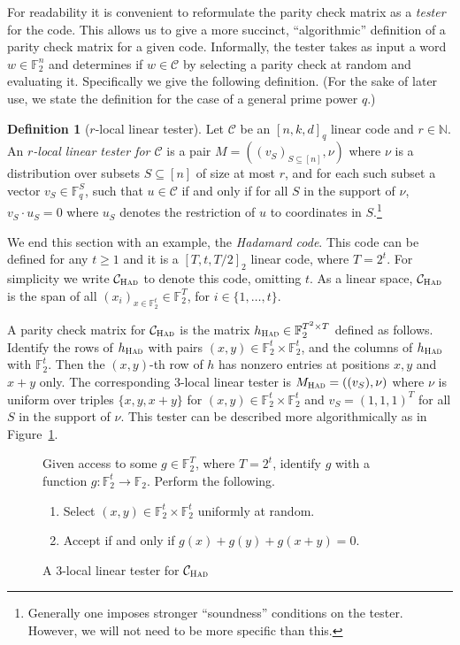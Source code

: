 \documentclass[11pt]{article}
\theoremstyle{definition}
\newtheorem{definition}[theorem]{Definition}
\newcommand{\code}{\mathcal{C}}
\newcommand{\field}{\mathbb{F}_2}
\newcommand{\N}{\ensuremath{\mathbb{N}}}
\newcommand{\F}{\ensuremath{\mathbb{F}}}
\newcommand{\mC}{\ensuremath{\mathcal{C}}}
\newcommand{\had}{\textsc{Had}}
\newenvironment{gamespec}{
  \begin{mdframed}[style=figstyle]}{
  \end{mdframed}}
\begin{document}
For readability it is convenient to reformulate the parity check matrix as a \emph{tester} for the code. This allows us to give a more succinct, ``algorithmic'' definition of a parity check matrix for a given code. Informally, the tester takes as input a word $w\in \F_2^n$ and determines if $w\in \mC$ by selecting a parity check at random and evaluating it. 
 Specifically we give the following definition. (For the sake of later use, we state the definition for the case of a general prime power $q$.)

\begin{definition}[$r$-local linear tester]\label{def:code-test}
Let $\code$ be an $[n,k,d]_q$ linear code and $r\in \N$.
An \emph{$r$-local linear tester for $\code$} is a pair $M = ((v_S)_{S \subseteq [n]},\nu)$ where $\nu$ is a distribution over subsets $S\subseteq [n]$ of size at most $r$, and for each such subset a vector $v_S\in\F_q^S$, such that $u\in \code$ if and only if for all $S$ in the support of $\nu$, $v_S\cdot u_S=0$ where $u_S$ denotes the restriction of $u$ to coordinates in $S$.\footnote{Generally one imposes stronger ``soundness'' conditions on the tester. However, we will not need to be more specific than this.}
\end{definition}

We end this section with an example, the \emph{Hadamard code}. This code can be defined for any  $t\geq 1$ and it is a $[T,t,T/2]_2$ linear code, where $T=2^t$. For simplicity we write  $\code_\had$ to denote this code, omitting $t$. As a linear space, $\code_\had$ is the span of all $(x_i)_{x\in \field^t} \in \field^T$, for $i\in \{1,\ldots,t\}$.  

A parity check matrix for $\code_\had$ is the matrix $h_\had\in \F_2^{T^2\times T}$ defined as follows. Identify the rows of $h_\had$ with pairs $(x,y)\in \F_2^t\times \F_2^t$, and the columns of $h_\had$ with $\F_2^t$. Then the $(x,y)$-th row of $h$ has nonzero entries at positions $x,y$ and $x+y$ only. The corresponding $3$-local linear tester is $M_\had=((v_S),\nu)$ where $\nu$ is uniform over triples $\{x,y,x+y\}$ for $(x,y)\in \F_2^t\times \F_2^t$ and $v_S = (1,1,1)^T$ for all $S$ in the support of $\nu$. This tester can be described more algorithmically as in Figure~\ref{fig:test-had}. 

\begin{figure}[!htbp]
  \centering
  \begin{gamespec}
	Given access to some $g\in \F_2^T$, where $T=2^t$, identify $g$ with a function $g:\F_2^t\to\F_2$. Perform the following. 
\begin{enumerate}
\item Select $(x,y)\in \F_2^t \times \F_2^t$ uniformly at random. 
\item Accept if and only if $g(x)+g(y)+g(x+y)=0$.  	
    \end{enumerate}
  \end{gamespec}
  \caption{A $3$-local linear tester for $\code_{\had}$}
  \label{fig:test-had}
\end{figure}
\end{document}
